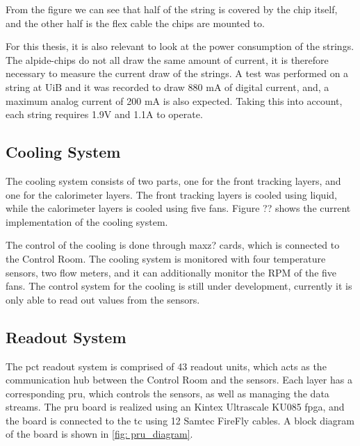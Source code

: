 \documentclass[main.tex]{subfiles}
\begin{document}
From the figure we can see that half of the string is covered by the chip itself, and the other half is the flex cable the chips are mounted to.

For this thesis, it is also relevant to look at the power consumption of the strings. The \gls{alpide}-chips do not all draw the same amount of current, it is therefore necessary to measure the current draw of the strings. A test was performed on a string at UiB and it was recorded to draw 880 mA of digital current, and, a maximum analog current of 200 mA is also expected. Taking this into account, each string requires 1.9V and 1.1A to operate. 


\subsection{Cooling System}

The cooling system consists of two parts, one for the front tracking layers, and one for the calorimeter layers. The front tracking layers is cooled using liquid, while the calorimeter layers is cooled using five fans. Figure ?? shows the current implementation of the cooling system.


The control of the cooling is done through maxz? cards, which is connected to the Control Room. The cooling system is monitored with four temperature sensors, two flow meters, and it can additionally monitor the RPM of the five fans. The control system for the cooling is still under development, currently it is only able to read out values from the sensors.


\subsection{Readout System}

The \gls{pct} readout system is comprised of 43 readout units, which acts as the communication hub between the Control Room and the sensors. Each layer has a corresponding \gls{pru}, which controls the sensors, as well as managing the data streams. The \gls{pru} board is realized using an Kintex Ultrascale KU085 \gls{fpga}, and the board is connected to the \gls{tc} using 12 Samtec FireFly cables. A block diagram of the board is shown in \autoref{fig: pru_diagram}.
\end{document}
